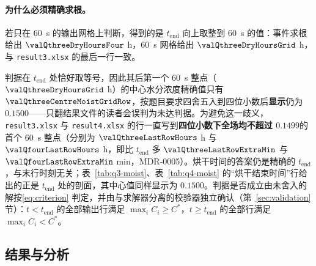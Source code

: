 \paragraph{为什么必须精确求根。} 若只在 \SI{60}{\second} 的输出网格上判断，得到的是 $t_{\mathrm{end}}$ 向上取整到 \SI{60}{\second} 的值：事件求根给出 $\valQthreeDryHoursFour$ h，\SI{60}{\second} 网格给出 $\valQthreeDryHoursGrid$ h，与 \nolinkurl{result3.xlsx} 的最后一行一致。

\begin{remark}[四位小数的显示与判据]\label{rem:rounding}
判据在 $t_{\mathrm{end}}$ 处恰好取等号，因此其后第一个 \SI{60}{\second} 整点（$\valQthreeDryHoursGrid$ h）的中心水分浓度精确值只有 $\valQthreeCentreMoistGridRow$，按题目要求四舍五入到四位小数后\textbf{显示}仍为 $0.1500$——只翻结果文件的读者会误判为未达判据。为避免这一歧义，\nolinkurl{result3.xlsx} 与 \nolinkurl{result4.xlsx} 的行一直写到\textbf{四位小数下全场均不超过 $0.1499$}的首个 \SI{60}{\second} 整点（分别为 $\valQthreeLastRowHours$ h 与 $\valQfourLastRowHours$ h，即比 $t_{\mathrm{end}}$ 多 $\valQthreeLastRowExtraMin$ 与 $\valQfourLastRowExtraMin$ \si{\minute}，MDR-0005）。烘干时间的答案仍是精确的 $t_{\mathrm{end}}$，与末行时刻无关；表~\ref{tab:q3-moist}、表~\ref{tab:q4-moist} 的“烘干结束时间”行给出的正是 $t_{\mathrm{end}}$ 处的剖面，其中心值同样显示为 $0.1500$。判据是否成立由未舍入的解按\eqref{eq:criterion} 判定，并由与求解器分离的校验器独立确认（第~\ref{sec:validation} 节）：$t<t_{\mathrm{end}}$ 的全部输出行满足 $\max_iC_i\ge C^\ast$，$t\ge t_{\mathrm{end}}$ 的全部行满足 $\max_iC_i<C^\ast$。
\end{remark}

\subsection{结果与分析}




